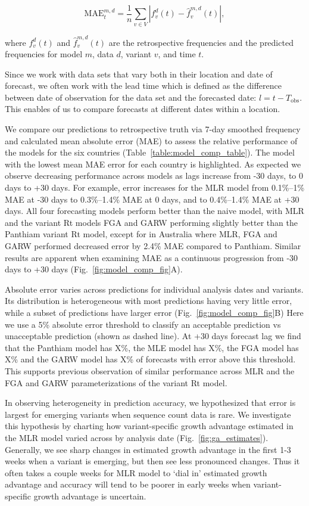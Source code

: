 \documentclass[11pt,oneside,letterpaper]{article}
\begin{document}
\begin{equation}
    \mathrm{MAE}_{t}^{m,d} = \frac{1}{n} \sum_{v \in V} \left|f_{v}^{d}(t) - \hat{f}^{m,d}_{v}(t) \right|,
\end{equation}

where $f_{v}^{d}(t)$ and $\hat{f}_{v}^{m,d}(t)$ are the retrospective frequencies and the predicted frequencies for model $m$, data  $d$, variant $v$, and time  $t$.

Since we work with data sets that vary both in their location and date of forecast, we often work with the lead time which is defined as the difference between date of observation for the data set and the forecasted date: $l = t - T_{\text{obs}}$.
This enables of us to compare forecasts at different dates within a location.

We compare our predictions to retrospective truth via 7-day smoothed frequency and calculated mean absolute error (MAE) to assess the relative performance of the models for the six countries (Table~\ref{table:model_comp_table}).
The model with the lowest mean MAE error for each country is highlighted.
As expected we observe decreasing performance across models as lags increase from -30 days, to 0 days to +30 days.
For example, error increases for the MLR model from 0.1\%--1\% MAE at -30 days to 0.3\%--1.4\% MAE at 0 days, and to 0.4\%--1.4\% MAE at +30 days.
All four forecasting models perform better than the naive model, with MLR and the variant Rt models FGA and GARW performing slightly better than the Panthiam variant Rt model, except for in Australia where MLR, FGA and GARW performed decreased error by 2.4\% MAE compared to Panthiam.
Similar results are apparent when examining MAE as a continuous progression from -30 days to +30 days (Fig.~\ref{fig:model_comp_fig}A).

Absolute error varies across predictions for individual analysis dates and variants.
Its distribution is heterogeneous with most predictions having very little error, while a subset of predictions have larger error (Fig.~\ref{fig:model_comp_fig}B)
Here we use a 5\% absolute error threshold to classify an acceptable prediction vs unacceptable prediction (shown as dashed line).
At +30 days forecast lag we find that the Panthiam model has X\%, the MLE model has X\%, the FGA model has X\% and the GARW model has X\% of forecasts with error above this threshold.
This supports previous observation of similar performance across MLR and the FGA and GARW parameterizations of the variant Rt model.

In observing heterogeneity in prediction accuracy, we hypothesized that error is largest for emerging variants when sequence count data is rare.
We investigate this hypothesis by charting how variant-specific growth advantage estimated in the MLR model varied across by analysis date (Fig.~\ref{fig:ga_estimates}).
Generally, we see sharp changes in estimated growth advantage in the first 1-3 weeks when a variant is emerging, but then see less pronounced changes.
Thus it often takes a couple weeks for MLR model to `dial in' estimated growth advantage and accuracy will tend to be poorer in early weeks when variant-specific growth advantage is uncertain.
\end{document}
